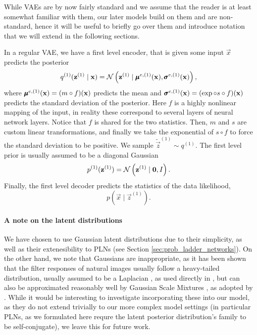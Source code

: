\par While VAEs are by now fairly standard and we assume that the reader is at
least somewhat familiar with them, our later models build on them and are
non-standard, hence it will be useful to briefly go over them and introduce
notation that we will extend in the following sections.


In a regular VAE, we have a first level encoder, that is given some input
$\vec{x}$ predicts the posterior
\[
  q^{(1)}(\mathbf{z}^{(1)} \mid \mathbf{x}) = \mathcal{N}\left( \mathbf{z}^{(1)} \mid
  \pmb{\mu}^{e, (1)}(\mathbf{x}), \pmb{\sigma}^{e, (1)}(\mathbf{x}) \right),
\]
where $\pmb{\mu}^{e, (1)}(\mathbf{x}) = (m \circ f)(\mathbf{x})$ predicts the mean and
$\pmb{\sigma}^{e, (1)}(\mathbf{x}) = (\exp \circ s \circ f)(\mathbf{x})$ predicts the
standard deviation of the posterior. Here $f$ is a highly nonlinear mapping of
the input, in reality these correspond to several layers of neural network
layers. Notice that $f$ is shared for the two statistics. Then, $m$ and $s$ are
custom linear transformations, and finally we take the exponential of $s \circ f
$ to force the standard deviation to be positive. We sample $\tilde{\vec{z}}^{(1)}
\sim q^{(1)}$.
The first level prior is usually assumed to be a diagonal Gaussian
\[
  p^{(1)}(\mathbf{z}^{(1)})  = \mathcal{N}\left( \mathbf{z}^{(1)} \mid \mathbf{0}, I \right).
\]
Finally, the first level decoder predicts the statistics of the data likelihood,
\[
  p(\vec{x} \mid \vec{z}^{(1)}).
\]

\paragraph{A note on the latent distributions} We have chosen to use Gaussian
latent distributions due to their simplicity, as well as their extenesibility to
PLNs (see Section \ref{sec:prob_ladder_networks}). On the other hand, we note
that Gaussians are inappropriate, as it has been shown that the filter responses
of natural images usually follow a heavy-tailed distribution, usually assumed to
be a Laplacian \cite{jain1989fundamentals}, as used directly in
\cite{clic2018winner}, but can also be approximated reasonably well by Gaussian
Scale Mixtures \cite{portilla2003image}, as adopted by \cite{theis2017lossy}.
While it would be interesting to investigate incorporating these into our
model, as they do not extend trivially to our more complex model settings (in
particular PLNs, as we formulated here requre the latent posterior
distribution's family to be self-conjugate), we leave this for future work.

